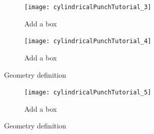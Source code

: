  \begin{figure}[h]
 \centering
  \begin{subfigure}{\textwidth}
 \texttt{[image: cylindricalPunchTutorial\_3]}
 \caption{Add a box}
  \label{cylindricalPunchTutorial1}
\end{subfigure}
  \begin{subfigure}{\textwidth}
 \texttt{[image: cylindricalPunchTutorial\_4]}
 \caption{Add a box}
  \label{cylindricalPunchTutorial2}
\end{subfigure}
   \caption{Geometry definition }
    \label{DDDnutshell}
 \end{figure}
 
  \begin{figure}[h]
 \centering
  \begin{subfigure}{\textwidth}
 \texttt{[image: cylindricalPunchTutorial\_5]}
 \caption{Add a box}
  \label{cylindricalPunchTutorial1}
\end{subfigure}
   \caption{Geometry definition }
    \label{DDDnutshell}
 \end{figure}


